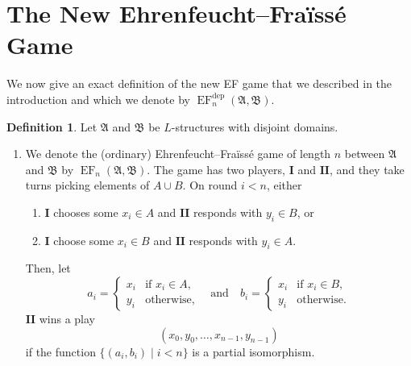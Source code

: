 \documentclass[12pt]{article}
\theoremstyle{definition}
\newtheorem{definition}{Definition}[section]
\newcommand{\playerone}{\mathrm{\mathbf{I}}}
\newcommand{\playertwo}{\mathrm{\mathbf{II}}}
\DeclareMathOperator{\EF}{EF}
\newcommand{\EFdep}{\EF^{\mathrm{dep}}}
\newcommand{\A}{\mathfrak{A}}
\newcommand{\B}{\mathfrak{B}}
\begin{document}
\section{The New Ehrenfeucht--Fraïssé Game}\label{The new game}

We now give an exact definition of the new EF game that we described in the introduction and which we denote by $\EFdep_n(\A,\B)$.

\begin{definition}
    Let $\A$ and $\B$ be $L$-structures with disjoint domains.
    \begin{enumerate}
        \item We denote the (ordinary) Ehrenfeucht--Fraïssé game of length $n$ between $\A$ and $\B$ by $\EF_n(\A,\B)$. The game has two players, $\playerone$ and $\playertwo$, and they take turns picking elements of $A\cup B$. On round $i<n$, either
        \begin{enumerate}
            \item $\playerone$ chooses some $x_i\in A$ and $\playertwo$ responds with $y_i\in B$, or
            \item $\playerone$ choose some $x_i\in B$ and $\playertwo$ responds with $y_i\in A$.
        \end{enumerate}
        Then, let
        \[
            a_i =
            \begin{cases}
                x_i & \text{if $x_i\in A$,} \\
                y_i & \text{otherwise,}
            \end{cases}
            \quad\text{and}\quad
            b_i =
            \begin{cases}
                x_i & \text{if $x_i\in B$,} \\
                y_i & \text{otherwise.}
            \end{cases}
        \]
        $\playertwo$ wins a play
        \[
            (x_0,y_0,\dots,x_{n-1},y_{n-1})
        \]
        if the function $\{(a_i,b_i) \mid i<n\}$ is a partial isomorphism.
        

\end{enumerate}
\end{definition}
\end{document}
